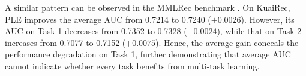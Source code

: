 \begin{table}[htbp]
\centering
\caption{Task-level AUC gains of STEM-Net relative to single-task models on KuaiRand1K.}
\label{tab:stem_task_gain}
\end{table}

A similar pattern can be observed in the MMLRec benchmark \citep{yuan2024mmlrec}. On KuaiRec, PLE improves the average AUC from 0.7214 to 0.7240 ($+0.0026$). However, its AUC on Task 1 decreases from 0.7352 to 0.7328 ($-0.0024$), while that on Task 2 increases from 0.7077 to 0.7152 ($+0.0075$). Hence, the average gain conceals the performance degradation on Task 1, further demonstrating that average AUC cannot indicate whether every task benefits from multi-task learning.


